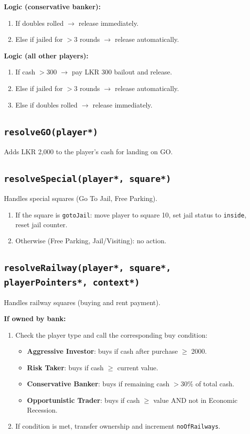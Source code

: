 \documentclass[12pt,a4paper]{article}
\begin{document}
\textbf{Logic (conservative banker):}
\begin{enumerate}[noitemsep]
    \item If doubles rolled $\rightarrow$ release immediately.
    \item Else if jailed for $>3$ rounds $\rightarrow$ release automatically.
\end{enumerate}

\textbf{Logic (all other players):}
\begin{enumerate}[noitemsep]
    \item If cash $> 300$ $\rightarrow$ pay LKR 300 bailout and release.
    \item Else if jailed for $>3$ rounds $\rightarrow$ release automatically.
    \item Else if doubles rolled $\rightarrow$ release immediately.
\end{enumerate}

\subsection{\texttt{resolveGO(player*)}}
Adds LKR 2,000 to the player's cash for landing on GO.

\subsection{\texttt{resolveSpecial(player*, square*)}}
Handles special squares (Go To Jail, Free Parking).
\begin{enumerate}[noitemsep]
    \item If the square is \texttt{gotoJail}: move player to square 10, set jail status to \texttt{inside}, reset jail counter.
    \item Otherwise (Free Parking, Jail/Visiting): no action.
\end{enumerate}

\subsection{\texttt{resolveRailway(player*, square*, playerPointers*, context*)}}
Handles railway squares (buying and rent payment).

\textbf{If owned by bank:}
\begin{enumerate}[noitemsep]
    \item Check the player type and call the corresponding buy condition:
    \begin{itemize}[noitemsep]
        \item \textbf{Aggressive Investor}: buys if cash after purchase $\geq$ 2000.
        \item \textbf{Risk Taker}: buys if cash $\geq$ current value.
        \item \textbf{Conservative Banker}: buys if remaining cash $> 30\%$ of total cash.
        \item \textbf{Opportunistic Trader}: buys if cash $\geq$ value AND not in Economic Recession.
    \end{itemize}
    \item If condition is met, transfer ownership and increment \texttt{noOfRailways}.
\end{enumerate}
\end{document}
